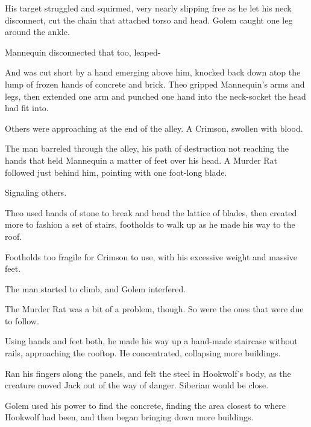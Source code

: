 His target struggled and squirmed, very nearly slipping free as he let his neck disconnect, cut the chain that attached torso and head.  Golem caught one leg around the ankle.



Mannequin disconnected that too, leaped-



And was cut short by a hand emerging above him, knocked back down atop the lump of frozen hands of concrete and brick.  Theo gripped Mannequin's arms and legs, then extended one arm and punched one hand into the neck-socket the head had fit into.



Others were approaching at the end of the alley.  A Crimson, swollen with blood.



The man barreled through the alley, his path of destruction not reaching the hands that held Mannequin a matter of feet over his head.  A Murder Rat followed just behind him, pointing with one foot-long blade.



Signaling others.



Theo used hands of stone to break and bend the lattice of blades, then created more to fashion a set of stairs, footholds to walk up as he made his way to the roof.



Footholds too fragile for Crimson to use, with his excessive weight and massive feet.



The man started to climb, and Golem interfered.



The Murder Rat was a bit of a problem, though.  So were the ones that were due to follow.



Using hands and feet both, he made his way up a hand-made staircase without rails, approaching the rooftop.  He concentrated, collapsing more buildings.



Ran his fingers along the panels, and felt the steel in Hookwolf's body, as the creature moved Jack out of the way of danger.  Siberian would be close.



Golem used his power to find the concrete, finding the area closest to where Hookwolf had been, and then began bringing down more buildings.



